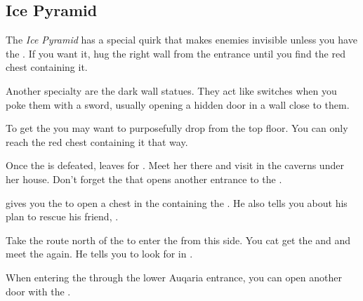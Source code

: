 \subsection{Ice Pyramid}
\label{map:ice_pyramid}

The \textit{Ice Pyramid} has a special quirk that makes enemies invisible unless you have the . If you want it, hug the right wall from the entrance until you find the red chest containing it.

Another specialty are the dark wall statues. They act like switches when you poke them with a sword, usually opening a hidden door in a wall close to them.

To get the  you may want to purposefully drop from the top floor. You can only reach the red chest containing it that way.

Once the  is defeated,  leaves for . Meet her there and visit  in the caverns under her house. Don't forget the  that opens another entrance to the .

 gives you the  to open a chest in the  containing the . He also tells you about his plan to rescue his friend, .

Take the route north of the  to enter the  from this side. You cat get the  and  and meet the  again. He tells you to look for  in .

When entering the  through the lower Auqaria entrance, you can open another door with the .


